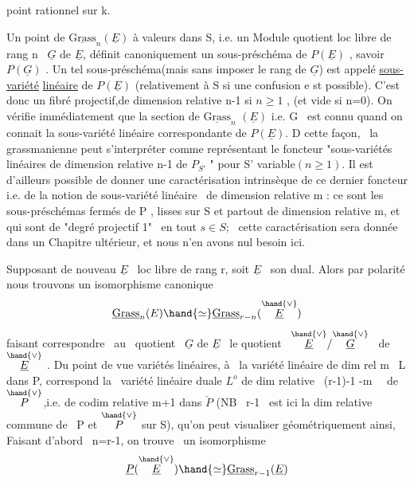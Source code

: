 
point rationnel sur k.

Un point de $\underline{\mathrm{Grass}}_n(\underline{E})$ à valeurs dans S, i.e. un Module quotient
loc libre de rang n \ $\underline{G}$ de $\underline{E}$, définit canoniquement un sous-préschéma
de $P(\underline{E})$ , savoir $P(\underline{G})$ . Un tel sous-préschéma(mais sans imposer le rang de $\underline{G}$) est appelé \uline{sous-variété}
\uline{linéaire} de $P(\underline{E})$ (relativement à S si une confusion e st possible).
C'est donc un fibré projectif,de dimension relative n-1 si $n\geqslant 1$ ,
(et vide si n=0). On vérifie immédiatement que la section de $\underline{\mathrm{Grass}}_n$
$(\underline{E})$ i.e. G \ est connu quand on connait la sous-variété linéaire
correspondante de $P(\underline{E})$. D cette façon, \ la grassmanienne peut
s'interpréter comme représentant le foncteur "sous-variétés linéaires
de dimension relative n-1  de $P_{S'}$ " pour S'
variable$(n\geqslant 1)$. Il est d'ailleurs possible de donner une caractérisation
intrinsèque de ce dernier foncteur i.e. de la notion de sous-variété
linéaire \ de dimension relative m : ce sont les sous-préschémas fermés
de P , lisses sur S et partout de dimension relative m, et qui sont
de "degré projectif 1" \ en tout $s\in S$; \ cette caractérisation sera
donnée dans un Chapitre ultérieur, et nous n'en avons nul besoin ici.

Supposant de nouveau $\underline{E}$ \ loc libre de rang r, soit $\underline{E}$ \ son dual. Alors
par polarité nous trouvons un isomorphisme canonique
\[ \underline{\mathrm{Grass}}_n(E) \hand{\simeq} \underline{\mathrm{Grass}}_{r-n}(\overset{\hand{\vee}}{\underline{E}}) \]
faisant correspondre \ au \ quotient \ $\underline{G}$ de $\underline{E}$ \ le quotient \ $\overset{\hand{\vee}}{\underline{E}}/\overset{\hand{\vee}}{\underline{G}}$ \ de $\overset{\hand{\vee}}{\underline{E}}$ .
Du point de vue variétés linéaires, à \ la variété linéaire de dim rel
m \ L dans P, correspond la \ variété linéaire duale $L^{o}$ de dim relative
 \ (r-1)-1 -m \ \ de $\overset{\hand{\vee}}{P}$,i.e. de codim relative m+1 dans $\check{P}$ (NB \ r-1 \ est ici la dim relative
commune de \ P et $\overset{\hand{\vee}}{P}$ sur S), qu'on peut visualiser géométriquement ainsi,
Faisant d'abord \ n=r-1, on trouve \ un isomorphisme
\[ \underline{P}(\overset{\hand{\vee}}{\underline{E}}) \hand{\simeq} \underline{\mathrm{Grass}}_{r-1}(\underline{E}) \]

